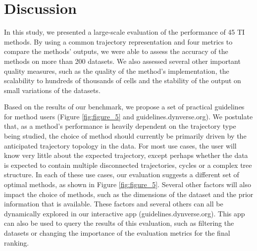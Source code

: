 \section{Discussion}

In this study, we presented a large-scale evaluation of the performance of 45 TI methods. By using a common trajectory representation and four metrics to compare the methods’ outputs, we were able to assess the accuracy of the methods on more than 200 datasets. We also assessed several other important quality measures, such as the quality of the method’s implementation, the scalability to hundreds of thousands of cells and the stability of the output on small variations of the datasets.

Based on the results of our benchmark, we propose a set of practical guidelines for method users (Figure \ref{fig:figure_5} and guidelines.dynverse.org). We postulate that, as a method’s performance is heavily dependent on the trajectory type being studied, the choice of method should currently be primarily driven by the anticipated trajectory topology in the data. For most use cases, the user will know very little about the expected trajectory, except perhaps whether the data is expected to contain multiple disconnected trajectories, cycles or a complex tree structure. In each of these use cases, our evaluation suggests a different set of optimal methods, as shown in Figure \ref{fig:figure_5}. Several other factors will also impact the choice of methods, such as the dimensions of the dataset and the prior information that is available. These factors and several others can all be dynamically explored in our interactive app (guidelines.dynverse.org). This app can also be used to query the results of this evaluation, such as filtering the datasets or changing the importance of the evaluation metrics for the final ranking.

